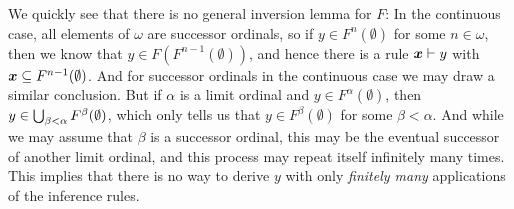 \documentclass[a4paper, 11pt, article, danish, oneside]{memoir}
\DeclareMathOperator*{\smallbigcup}{\textstyle\bigcup}
\DeclareMathOperator*{\bigunion}{\mathchoice
    {\smallbigcup}%
    {\bigcup}%
    {\bigcup}%
    {\bigcup}%
}
\begin{document}
We quickly see that there is no general inversion lemma for $F$: In the continuous case, all elements of $\omega$ are successor ordinals, so if $y \in F^n(\emptyset)$ for some $n \in \omega$, then we know that $y \in F(F^{n-1}(\emptyset))$, and hence there is a rule $\myinfrule{}{\seq{x}}{y}$ with $\bm{x} \subseteq F^{n-1}(\emptyset)$. And for successor ordinals in the continuous case we may draw a similar conclusion. But if $\alpha$ is a limit ordinal and $y \in F^\alpha(\emptyset)$, then $y \in \bigunion_{\beta < \alpha} F^\beta(\emptyset)$, which only tells us that $y \in F^\beta(\emptyset)$ for some $\beta < \alpha$. And while we may assume that $\beta$ is a successor ordinal, this may be the eventual successor of another limit ordinal, and this process may repeat itself infinitely many times. This implies that there is no way to derive $y$ with only \emph{finitely many} applications of the inference rules.

\newcommand{\myinfruleAlign}[3]{\myinfrule{#1}{#2&}{#3}}
\end{document}
